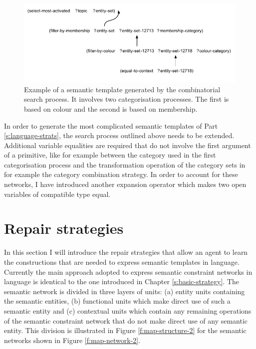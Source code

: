 \begin{figure}[htbp]
  \begin{center}
    \includegraphics[width=\textwidth]{./composition/figures/composed-network.pdf}
    \caption[Example of a semantic template generated by the
    combinatorial search process]{Example of a semantic template
      generated by the combinatorial search process. It involves two
      categorisation processes. The first is based on colour and the
      second is based on membership.}
    \label{f:composed-network}
  \end{center}
\end{figure}

In order to generate the most complicated semantic templates of Part
\ref{s:language-strats}, the search process outlined above needs to be
extended. Additional variable equalities are required that do not
involve the first argument of a primitive, like for example between
the category used in the first categorisation process and the
transformation operation of the category sets in for example the
category combination strategy. In order to account for these
networks, I have introduced another expansion operator which makes two
open variables of compatible type equal.

\section{Repair strategies}
\label{s:repair-strategies}

In this section I will introduce the repair strategies that allow an
agent to learn the constructions that are needed to express semantic
templates in language. Currently the main approach adopted to express
semantic constraint networks in language is identical to the one
introduced in Chapter \ref{s:basic-strategy}. The semantic network is
divided in three layers of units: (a) entity units containing the
semantic entities, (b) functional units which make direct use of such
a semantic entity and (c) contextual units which contain any remaining
operations of the semantic constraint network that do not make direct
use of any semantic entity. This division is illustrated in Figure
\ref{f:map-structure-2} for the semantic networks shown in Figure
\ref{f:map-network-2}.

